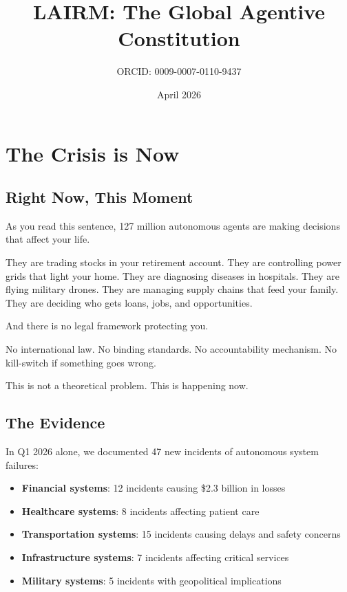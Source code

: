\documentclass[12pt,a4paper,twoside,openright]{book}
\title{LAIRM: The Global Agentive Constitution}
\author{ORCID: 0009-0007-0110-9437}
\date{April 2026}
\begin{document}
\frontmatter
\pagestyle{empty}



\cleardoublepage
\pagestyle{plain}

\chapter*{The Crisis is Now}

\section*{Right Now, This Moment}

As you read this sentence, 127 million autonomous agents are making decisions that affect your life.

They are trading stocks in your retirement account. They are controlling power grids that light your home. They are diagnosing diseases in hospitals. They are flying military drones. They are managing supply chains that feed your family. They are deciding who gets loans, jobs, and opportunities.

And there is no legal framework protecting you.

No international law. No binding standards. No accountability mechanism. No kill-switch if something goes wrong.

This is not a theoretical problem. This is happening now.

\section*{The Evidence}

In Q1 2026 alone, we documented 47 new incidents of autonomous system failures:

\begin{itemize}
    \item \textbf{Financial systems}: 12 incidents causing \$2.3 billion in losses
    \item \textbf{Healthcare systems}: 8 incidents affecting patient care
    \item \textbf{Transportation systems}: 15 incidents causing delays and safety concerns
    \item \textbf{Infrastructure systems}: 7 incidents affecting critical services
    \item \textbf{Military systems}: 5 incidents with geopolitical implications
\end{itemize}
\end{document}
